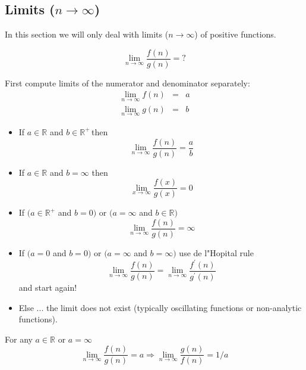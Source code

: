 \documentclass[justified, sixbynine]{tufte-book}
\theoremstyle{plain}%
\newtheorem * {corollary}{Corollary}
\theoremstyle{definition}
\theoremstyle{remark}
\newtheorem * {remark}{Remark}
\newtheorem * {note}{Note}
\begin{document}
\begin{fullwidth}
\goodbreak\subsection{Limits ($n\rightarrow \infty $)}

In this section we will only deal with limits ($n\rightarrow \infty $) of
positive functions.

\begin{equation}
\lim_{n\rightarrow \infty }\frac{f(n)}{g(n)}=?
\end{equation}

First compute limits of the numerator and denominator separately:
\begin{eqnarray}
\lim_{n\rightarrow \infty }f(n) &=&a \\
\lim_{n\rightarrow \infty }g(n) &=&b
\end{eqnarray}

\begin{itemize}
\item  If $a\in \mathbb{R}$ and $b\in \mathbb{R}^{+}\, $then
\begin{equation}
\lim_{n\rightarrow \infty }\frac{f(n)}{g(n)}=\frac ab
\end{equation}

\item  If $a\in \mathbb{R}$ and $b=\infty $ then
\begin{equation}
\lim_{x\rightarrow \infty }\frac{f(x)}{g(x)}=0
\end{equation}

\item  If $(a\in \mathbb{R}^{+}$ and $b=0)$ or $(a=\infty$ and $b\in
\mathbb{R})$
\begin{equation}
\lim_{n\rightarrow \infty }\frac{f(n)}{g(n)}=\infty
\end{equation}

\item  If $(a=0$ and $b=0)$ or $(a=\infty$ and $b=\infty)$
use de l"Hopital rule
\begin{equation}
\lim_{n\rightarrow \infty }\frac{f(n)}{g(n)}=\lim_{n\rightarrow \infty }%
\frac{f^{\prime }(n)}{g^{\prime }(n)}
\end{equation}
and start again!

\item  Else ... the limit does not exist (typically oscillating functions or
non-analytic functions).
\end{itemize}

For any $a\in \mathbb{R}$ or $a=\infty $%
\begin{equation}
\lim_{n\rightarrow \infty }\frac{f(n)}{g(n)}=a\Rightarrow \lim_{n\rightarrow
\infty }\frac{g(n)}{f(n)}=1/a
\end{equation}


\end{fullwidth}
\end{document}
